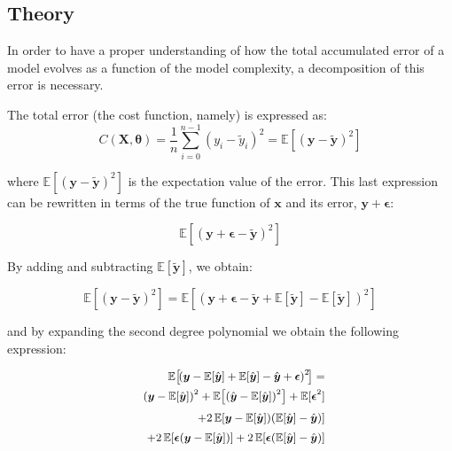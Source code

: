 \documentclass[11pt,a4paper,twocolumn]{article}
\begin{document}
\subsection{Theory}
In order to have a proper understanding of how the total accumulated error of a model evolves as a function of the model complexity, a decomposition of this error is necessary.

The total error (the cost function, namely) is expressed as:
\begin{equation}
	C(\boldsymbol{X},\boldsymbol{\theta}) = \frac{1}{n}\sum_{i=0}^{n-1}(y_i-\tilde{y}_i)^2 = \mathbb{E}\left[(\boldsymbol{y}-\boldsymbol{\tilde{y}})^2\right]
\end{equation}

where $\mathbb{E}\left[(\boldsymbol{y}-\boldsymbol{\tilde{y}})^2\right]$ is the expectation value of the error.
This last expression can be rewritten in terms of the true function of $\boldsymbol{x}$ and its error, $\boldsymbol{y} + \boldsymbol{\epsilon}$:

\begin{equation}
	\mathbb{E}\left[(\boldsymbol{y}+\boldsymbol{\epsilon}-\boldsymbol{\tilde{y}})^2\right]
\end{equation}

By adding and subtracting $\mathbb{E}[\tilde{\boldsymbol{y}}]$, we obtain:

\begin{equation}
	\mathbb{E}\left[(\boldsymbol{y}-\boldsymbol{\tilde{y}})^2\right]=\mathbb{E}\left[(\boldsymbol{y}+\boldsymbol{\epsilon}-\boldsymbol{\tilde{y}}+\mathbb{E}\left[\boldsymbol{\tilde{y}}\right]-\mathbb{E}\left[\boldsymbol{\tilde{y}}\right])^2\right]
\end{equation}

and by expanding the second degree polynomial we obtain the following expression:

\[
	\small
	\begin{aligned} \mathbb{E}\!\left[\!\left(\boldsymbol{y} - \mathbb{E}[\hat{\boldsymbol{y}}] + \mathbb{E}[\hat{\boldsymbol{y}}] - \hat{\boldsymbol{y}} + \boldsymbol{\epsilon}\right)^2\!\right] =\\ (\boldsymbol{y}-\mathbb{E}[\hat{\boldsymbol{y}}])^2 + \mathbb{E}\!\left[(\hat{\boldsymbol{y}}-\mathbb{E}[\hat{\boldsymbol{y}}])^2\right] + \mathbb{E}[\boldsymbol{\epsilon}^2] \\[2pt] \quad + 2\,\mathbb{E}\!\left[\boldsymbol{y}-\mathbb{E}[\hat{\boldsymbol{y}}])(\mathbb{E}[\hat{\boldsymbol{y}}]-\hat{\boldsymbol{y}})\right] \\[2pt] \quad + 2\,\mathbb{E}\!\left[\boldsymbol{\epsilon}(\boldsymbol{y}-\mathbb{E}[\hat{\boldsymbol{y}}])\right] + 2\,\mathbb{E}\!\left[\boldsymbol{\epsilon}(\mathbb{E}[\hat{\boldsymbol{y}}]-\hat{\boldsymbol{y}})\right]
	\end{aligned}
\]
\end{document}
